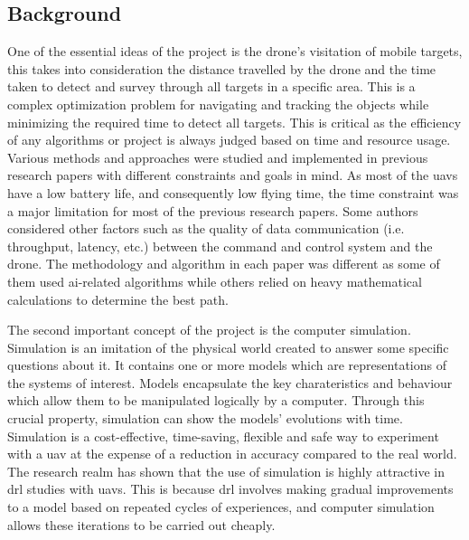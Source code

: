\documentclass[../main.tex]{subfiles}
\begin{document}
	
	\subsection{Background}
	
	One of the essential ideas of the project 
	is the drone's visitation of mobile 
	targets, this takes into consideration 
	the distance travelled by the drone and 
	the time taken to detect and survey 
	through all targets in a specific area.
	This is a complex optimization problem 
	for navigating and tracking the objects 
	while minimizing the required time to detect all targets.
	This is critical as the efficiency of any algorithms 
	or project is always judged based on time 
	and resource usage.
	Various methods and approaches were studied 
	and implemented 
	in previous research papers with different 
	constraints and 
	goals in mind.
	As most of the \glspl{uav} have a low battery life, 
	and consequently low flying time, the time 
	constraint was a major limitation 
	for most of the previous research papers. 
	Some authors considered other factors such 
	as the quality 
	of data communication (i.e. throughput, latency, etc.) 
	between the command and control 
	system and the drone.
	The methodology and algorithm in each paper was 
	different 
	as some of them used \gls{ai}-related algorithms while 
	others relied 
	on heavy mathematical calculations to determine 
	the best path.
	
	The second important concept of the project is the computer simulation.
	Simulation is an imitation of the physical world
	created to answer some specific questions about it.
	It contains one or more models 
	which are representations of the systems of interest.
	Models encapsulate the key charateristics and behaviour 
	which allow them to be manipulated logically by a computer.
	Through this crucial property, simulation can show 
	the models' evolutions with time.
	Simulation is a cost-effective, time-saving, flexible 
	and safe way to experiment with a \gls{uav}
	at the expense of a reduction in accuracy compared to the real world.
	The research realm has shown that the use of simulation 
	is highly attractive in \gls{drl} studies with \glspl{uav}.
	This is because \gls{drl} involves
	making gradual improvements to a model based on 
	repeated cycles of experiences, and computer simulation 
	allows these iterations to be carried out cheaply.
	
\end{document}
